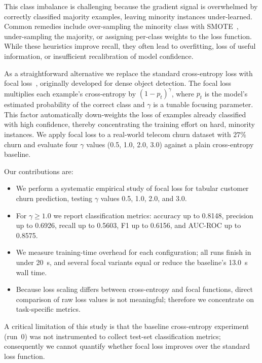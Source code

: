 \documentclass[11pt,a4paper]{article}
\begin{document}
This class imbalance is challenging because the gradient signal is overwhelmed by correctly classified majority examples, leaving minority instances under-learned. Common remedies include over-sampling the minority class with SMOTE~\cite{chawla2002smote}, under-sampling the majority, or assigning per-class weights to the loss function. While these heuristics improve recall, they often lead to overfitting, loss of useful information, or insufficient recalibration of model confidence.

As a straightforward alternative we replace the standard cross-entropy loss with focal loss~\cite{lin2017focal}, originally developed for dense object detection. The focal loss multiplies each example's cross-entropy by $(1-p_t)^\gamma$, where $p_t$ is the model's estimated probability of the correct class and $\gamma$ is a tunable focusing parameter. This factor automatically down-weights the loss of examples already classified with high confidence, thereby concentrating the training effort on hard, minority instances. We apply focal loss to a real-world telecom churn dataset with $27\%$ churn and evaluate four $\gamma$ values (0.5, 1.0, 2.0, 3.0) against a plain cross-entropy baseline.

Our contributions are:
\begin{itemize}
    \item We perform a systematic empirical study of focal loss for tabular customer churn prediction, testing $\gamma$ values 0.5, 1.0, 2.0, and 3.0.
    \item For $\gamma \ge 1.0$ we report classification metrics: accuracy up to 0.8148, precision up to 0.6926, recall up to 0.5603, F1 up to 0.6156, and AUC-ROC up to 0.8575.
    \item We measure training-time overhead for each configuration; all runs finish in under 20~s, and several focal variants equal or reduce the baseline’s 13.0~s wall time.
    \item Because loss scaling differs between cross-entropy and focal functions, direct comparison of raw loss values is not meaningful; therefore we concentrate on task-specific metrics.
\end{itemize}
A critical limitation of this study is that the baseline cross-entropy experiment (run~0) was not instrumented to collect test-set classification metrics; consequently we cannot quantify whether focal loss improves over the standard loss function.
\end{document}
